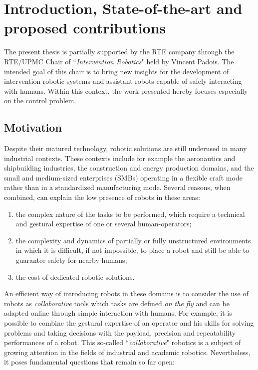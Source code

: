 \chapter{Introduction, State-of-the-art and proposed contributions}
\label{chap:Litreview}
The present thesis is partially supported by the RTE company through the RTE/UPMC Chair of ``\textit{Intervention Robotics}" held by Vincent Padois. The intended goal of this chair is to bring new insights for the development of intervention robotic systems and assistant robots capable of safely interacting with humans. Within this context, the work presented hereby focuses especially on the control problem.
\section{Motivation}
Despite their matured technology, robotic solutions are still underused in many industrial contexts. These contexts include for example the aeronautics and shipbuilding industries, the construction and energy production domains, and the small and medium-sized enterprises (SMBs) operating in a flexible craft mode rather than in a standardized manufacturing mode. Several reasons, when combined, can explain the low presence of robots in these areas: 
\begin{enumerate}
\item the complex nature of the tasks to be performed, which require a technical and gestural expertise of one or several human-operators;
\item the complexity and dynamics of partially or fully unstructured environments in which it is difficult, if not impossible, to place a robot and still be able to guarantee safety for nearby humans;
\item the cost of dedicated robotic solutions.
\end{enumerate}
An efficient way of introducing robots in these domains is to consider the use of robots as \textit{collaborative} tools which tasks are defined \textit{on the fly} and can be adapted online through simple interaction with humans. For example, it is possible to combine the gestural expertise of an operator and his skills for solving problems and taking decisions with the payload, precision and repeatability performances of a robot. This so-called ``\textit{collaborative}" robotics is a subject of growing attention in the fields of industrial and academic robotics. Nevertheless, it poses fundamental questions that remain so far open:
